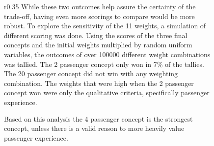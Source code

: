 \begin{figure}[10]{r}{0.35\textwidth}
While these two outcomes help assure the certainty of the trade-off, having even more scorings to compare would be more robust. To explore the sensitivity of the 11 weights, a simulation of different scoring was done. Using the scores of the three final concepts and the initial weights multiplied by random uniform variables, the outcomes of over 100000 different weight combinations was tallied. The 2 passenger concept only won in 7\% of the tallies. The 20 passenger concept did not win with any weighting combination. The weights that were high when the 2 passenger concept won were only the qualitative criteria, specifically passenger experience. 

Based on this analysis the 4 passenger concept is the strongest concept, unless there is a valid reason to more heavily value passenger experience.


\end{figure}
